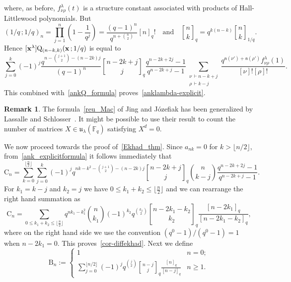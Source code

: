 \documentclass[12pt,a4paper,reqno]{amsart}
\theoremstyle{plain}
\theoremstyle{definition}
\newtheorem{remark}[theorem]{Remark}
\newcommand{\FF}{{\mathbb{F}}}
\newcommand{\1}{\mathds{1}}
\newcommand{\Q}{\mathrm{Q}}
\newcommand{\B}{\mathrm{B}}
\renewcommand{\u}{\mathfrak{u}}
\newcommand{\x}{{\bf x}}
\newcommand{\fn}{\mathsf{n}}
\begin{document}
where, as before, $f_{\nu\rho}^\lambda(t)$ is a structure constant associated with products of Hall-Littlewood polynomials.  
But \[
(1/q\,;1/q)_n=\prod_{j=1}^n\left(1-\frac{1}{q^j}\right)=\frac{(q-1)^n}{q^{n+\binom{n}{2}}}[n]_q!\quad\text{and}\quad
{n \brack k}_q=q^{k(n-k)}{n\brack k}_{1/q}.
\]
Hence  $[\x^\lambda]\Q_{(n-k,k)}(\x\, ;1/q)$ is equal to
\begin{equation*}
\sum_{j=0}^k(-1)^j\frac{q^{n-\binom{j+1}{2}-(n-2k)j}}{(q-1)^n}{n-2k+j \brack j}_q\frac{q^{n-2k+2j}-1}{q^{n-2k+j}-1}\sum_{\substack{\nu\, \vdash n-k+j\\ \rho\, \vdash k-j}}\frac{q^{\fn(\nu')+\fn(\rho')}f_{\nu\rho}^\lambda(1)}{[\nu]![\rho]!}.
\end{equation*}
This combined with~\cref{ankQ_formula} proves~\cref{anklambda-explicit}. 
\begin{remark}
The formula~\cref{reu_Mac} of    Jing and J\'{o}zefiak  has been generalized by Lassalle and Schlosser~\cite[Theorem 4.1]{Lassalle}. It might be possible to use their result to count the number of matrices $X\in\u_\lambda(\FF_q)$ satisfying $X^d=0$.  
\end{remark}
We now proceed towards the proof of~\cref{Ekhad_thm}.
Since $a_{nk}=0$ for $k>\lfloor n/2\rfloor $, 
 from~\cref{ank_explicitformula} it follows immediately that 
\begin{equation*}
\mathrm{C}_n=\sum_{k=0}^{ \lfloor\frac{n}{2}\rfloor}
\sum_{j=0}^k(-1)^jq^{nk-k^2-\binom{j+1}{2}-(n-2k)j}{n-2k+j \brack j}_q\binom{n}{k-j}\frac{q^{n-2k+2j}-1}{q^{n-2k+j}-1}
.
\end{equation*}
For $k_1=k-j$ and $k_2=j$ we have $0\leq k_1+k_2\leq \lfloor\frac n2\rfloor$
and we can rearrange the right hand summation as
\begin{equation*}
\mathrm{C}_{n}=
\sum_{0\leq k_1+k_2\leq\lfloor\frac n 2 \rfloor}q^{nk_1-k_1^2}\binom{n}{k_1}
(-1)^{k_2}q^{\binom{k_2}{2}}{n-2k_1-k_2 \brack k_2}_q\frac{[n-2k_1]_q}{[n-2k_1-k_2]_q},
\end{equation*}
where on the right hand side we use the convention $(q^0-1)/(q^0-1)=1$ when $n-2k_1=0$. This proves~\cref{cor-diffekhad}.
Next we define 
$$
\B_n:=\begin{cases}
    1 & n=0;\\
\displaystyle    \sum_{j=0}^{\lfloor n/2\rfloor }(-1)^jq^{\binom{j}{2}}{n-j \brack j}_q\frac{[n]_q}{[n-j]_q} & n\geq 1.
\end{cases}
$$
\end{document}
